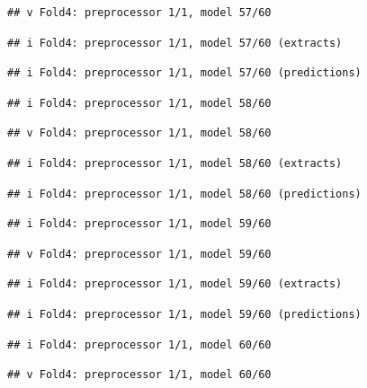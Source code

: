 \documentclass[
]{article}
\begin{document}
\begin{verbatim}
## v Fold4: preprocessor 1/1, model 57/60
\end{verbatim}

\begin{verbatim}
## i Fold4: preprocessor 1/1, model 57/60 (extracts)
\end{verbatim}

\begin{verbatim}
## i Fold4: preprocessor 1/1, model 57/60 (predictions)
\end{verbatim}

\begin{verbatim}
## i Fold4: preprocessor 1/1, model 58/60
\end{verbatim}

\begin{verbatim}
## v Fold4: preprocessor 1/1, model 58/60
\end{verbatim}

\begin{verbatim}
## i Fold4: preprocessor 1/1, model 58/60 (extracts)
\end{verbatim}

\begin{verbatim}
## i Fold4: preprocessor 1/1, model 58/60 (predictions)
\end{verbatim}

\begin{verbatim}
## i Fold4: preprocessor 1/1, model 59/60
\end{verbatim}

\begin{verbatim}
## v Fold4: preprocessor 1/1, model 59/60
\end{verbatim}

\begin{verbatim}
## i Fold4: preprocessor 1/1, model 59/60 (extracts)
\end{verbatim}

\begin{verbatim}
## i Fold4: preprocessor 1/1, model 59/60 (predictions)
\end{verbatim}

\begin{verbatim}
## i Fold4: preprocessor 1/1, model 60/60
\end{verbatim}

\begin{verbatim}
## v Fold4: preprocessor 1/1, model 60/60
\end{verbatim}
\end{document}
